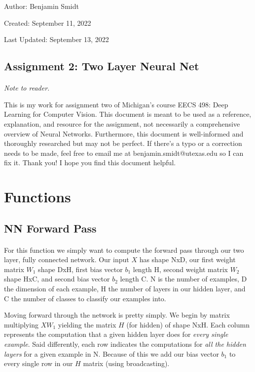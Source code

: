 \documentclass[12pt]{article}
\begin{document}
\noindent Author: Benjamin Smidt

\noindent Created: September 11, 2022

\noindent Last Updated: September 13, 2022
\begin{center}
\section*{Assignment 2: Two Layer Neural Net}
\end{center}

\paragraph{} \emph{Note to reader.} 

This is my work for assignment two of Michigan's course
EECS 498: Deep Learning for Computer Vision. This document is meant to be used as a reference, 
explanation, and resource for the assignment, not necessarily a comprehensive overview
of Neural Networks. Furthermore, this document is well-informed and thoroughly researched but
may not be perfect. If there's a typo or a correction needs to be made, feel free to 
email me at benjamin.smidt@utexas.edu so I can fix it. Thank you! I hope you find this 
document helpful.

\tableofcontents{}

\section{Functions} 

\subsection{NN Forward Pass}
\paragraph{}
For this function we simply want to compute the forward pass through our two layer, fully connected 
network. Our input $X$ has shape NxD, our first weight matrix $W_1$ shape DxH, first 
bias vector $b_1$ length H, second weight matrix $W_2$ shape HxC, and second bias vector
$b_2$ length C. N is the number of examples, D the dimension of each example, H the number
of layers in our hidden layer, and C the number of classes to classify our examples into. 

Moving forward through the network is pretty simply. We begin by matrix multiplying 
$XW_1$ yielding the matrix $H$ (for hidden) of shape NxH. Each column represents the computation
that a given hidden layer does for \emph{every single example}. Said differently, each row
indicates the computations for \emph{all the hidden layers} for a given example in N. 
Because of this we add our bias vector $b_1$ to every single row in our $H$ matrix
(using broadcasting). 
\end{document}
